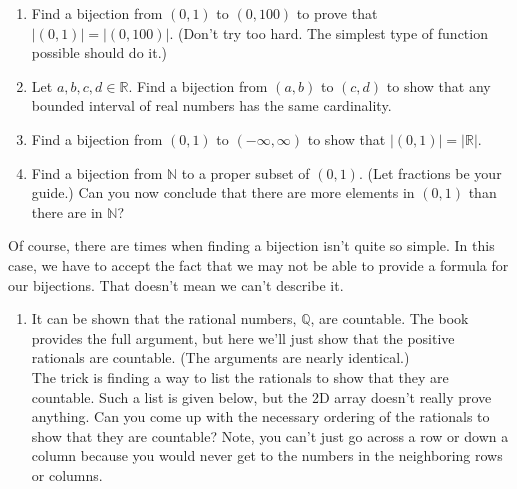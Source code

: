 \documentclass[12 pt]{article}
\newcommand{\R}{\mathbb{R}}
\newcommand{\Q}{\mathbb{Q}}
\newcommand{\N}{\mathbb{N}}
\theoremstyle{definition}
\theoremstyle{plain}
\theoremstyle{mytheorem}
\theoremstyle{myexample}
\theoremstyle{mydefinition}
\begin{document}
\begin{enumerate}[resume]
\item Find a bijection from $(0,1)$ to $(0,100)$ to prove that $|(0,1)|=|(0,100)|$.  (Don't try too hard.  The simplest type of function possible should do it.)

\vspace{2in}
\item Let $a,b,c,d\in \R$.  Find a bijection from $(a,b)$ to $(c,d)$ to show that any bounded interval of real numbers has the same cardinality.

\vspace{2in}
\item Find a bijection from $(0,1)$ to $(-\infty,\infty)$ to show that $|(0,1)|=|\R|$.

\vspace{2in}
\item Find a bijection from $\N$ to a proper subset of $(0,1)$.  (Let fractions be your guide.)  Can you now conclude that there are more elements in $(0,1)$ than there are in $\N$?

\vspace{3in}
\end{enumerate}

Of course, there are times when finding a bijection isn't quite so simple.  In this case, we have to accept the fact that we may not be able to provide a formula for our bijections.  That doesn't mean we can't describe it.

\begin{enumerate}[resume]
\item It can be shown that the rational numbers, $\Q$, are countable.  The book provides the full argument, but here we'll just show that the positive rationals are countable.  (The arguments are nearly identical.)\\

The trick is finding a way to list the rationals to show that they are countable.  Such a list is given below, but the 2D array doesn't really prove anything.  Can you come up with the necessary ordering of the rationals to show that they are countable?  Note, you can't just go across a row or down a column because you would never get to the numbers in the neighboring rows or columns.
\begin{center}
\end{center}
\end{enumerate}
\end{document}
